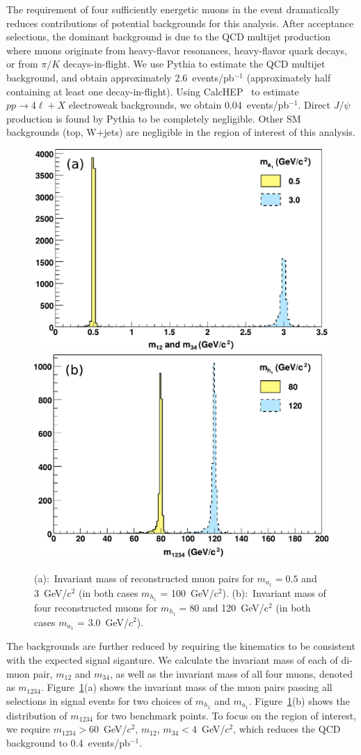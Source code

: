 \documentclass[aps,prl,twocolumn,nofootinbib,superscriptaddress]{revtex4}
\begin{document}
The requirement of four sufficiently energetic muons in the event
dramatically reduces contributions of potential backgrounds for this
analysis.  After acceptance selections, the dominant background is due
to the QCD multijet production where muons originate from heavy-flavor
resonances, heavy-flavor quark decays, or from $\pi/K$
decays-in-flight.  We use Pythia to estimate the QCD multijet
background, and obtain approximately 2.6~events/pb$^{-1}$
(approximately half containing at least one decay-in-flight).  Using
CalcHEP~\cite{calchep} to estimate $pp \to 4\ell + X$ electroweak
backgrounds, we obtain 0.04~events/pb$^{-1}$.  Direct $J/\psi$
production is found by Pythia to be completely negligible.  Other SM
backgrounds (top, W+jets) are negligible in the region of interest of
this analysis.

\begin{figure}[htb]
\begin{center}
\includegraphics[width=0.48\linewidth]{plots/muon_pair_masses_new}
\hfill
\includegraphics[width=0.48\linewidth]{plots/fourmuon_invariant_mass_new}

\caption{(a):~Invariant mass of reconstructed muon pairs for $m_{a_1}
  = 0.5$ and 3~GeV/c$^2$ (in both cases $m_{h_1}$ = 100~GeV/c$^2$).
  (b):~Invariant mass of four reconstructed muons for $m_{h_1} = 80$ and
  120~GeV/c$^2$ (in both cases $m_{a_1}$ = 3.0~GeV/$c^2$).}
\label{muon_pairs_masses_invariant_mass}
\end{center}
\end{figure}

The backgrounds are further reduced by requiring the kinematics to be
consistent with the expected signal siganture.  We calculate the
invariant mass of each of di-muon pair, $m_{12}$ and $m_{34}$, as well
as the invariant mass of all four muons, denoted as
$m_{1234}$. Figure~\ref{muon_pairs_masses_invariant_mass}(a) shows the
invariant mass of the muon pairs passing all selections in signal
events for two choices of $m_{h_1}$ and
$m_{a_1}$. Figure~\ref{muon_pairs_masses_invariant_mass}(b) shows the
distribution of $m_{1234}$ for two benchmark points.  To focus on the
region of interest, we require $m_{1234} > 60$~GeV/$c^2$, $m_{12}$,
$m_{34} < 4$~GeV/$c^2$, which reduces the QCD background to
0.4~events/pb$^{-1}$.
\end{document}
